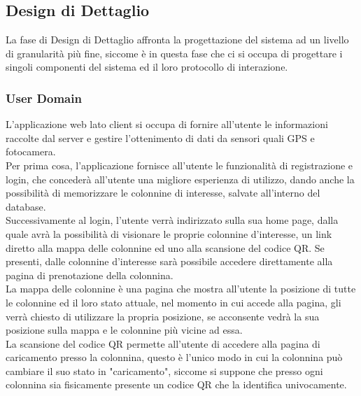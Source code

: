 \subsection{Design di Dettaglio}
La fase di Design di Dettaglio affronta la progettazione del sistema ad un livello di granularità
più fine, siccome è in questa fase che ci si occupa di progettare i singoli componenti del
sistema ed il loro protocollo di interazione.\\

\subsubsection{User Domain}

L'applicazione web lato client si occupa di fornire all'utente le informazioni raccolte dal server
e gestire l'ottenimento di dati da sensori quali GPS e fotocamera.\\

Per prima cosa, l'applicazione fornisce all'utente le funzionalità di registrazione e login,
che concederà all'utente una migliore esperienza di utilizzo, dando anche la possibilità di
memorizzare le colonnine di interesse, salvate all'interno del database.\\

Successivamente al login, l'utente verrà indirizzato sulla sua home page, dalla quale avrà la possibilità
di visionare le proprie colonnine d'interesse, un link diretto alla mappa delle colonnine ed uno
alla scansione del codice QR. Se presenti, dalle colonnine d'interesse sarà possibile accedere
direttamente alla pagina di prenotazione della colonnina.\\

La mappa delle colonnine è una pagina che mostra all'utente la posizione di tutte le colonnine ed il loro stato attuale,
nel momento in cui accede alla pagina, gli verrà chiesto di utilizzare la propria posizione,
se acconsente vedrà la sua posizione sulla mappa e le colonnine più vicine ad essa.\\

La scansione del codice QR permette all'utente di accedere alla pagina di caricamento presso la colonnina,
questo è l'unico modo in cui la colonnina può cambiare il suo stato in "caricamento", siccome si suppone che
presso ogni colonnina sia fisicamente presente un codice QR che la identifica univocamente.\\

